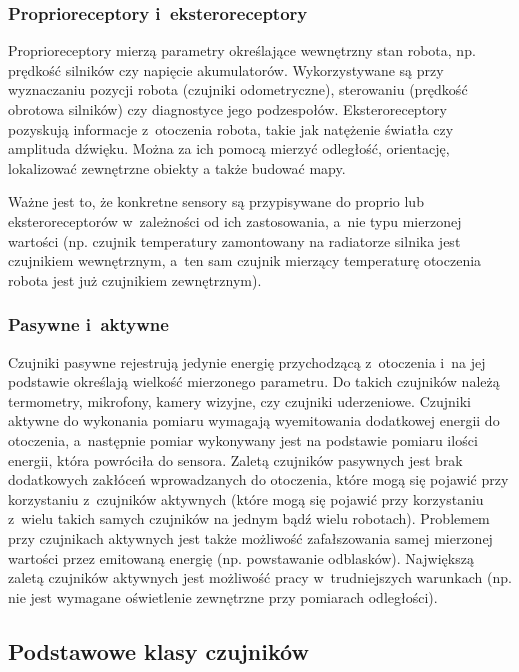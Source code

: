 \subsubsection{Proprioreceptory i~eksteroreceptory}

Proprioreceptory mierzą parametry określające wewnętrzny stan
robota, np. prędkość silników czy napięcie akumulatorów. Wykorzystywane są
przy wyznaczaniu pozycji robota (czujniki odometryczne), sterowaniu (prędkość
obrotowa silników) czy diagnostyce jego podzespołów. Eksteroreceptory
pozyskują informacje z~otoczenia robota, takie jak natężenie
światła czy amplituda dźwięku. Można za ich pomocą mierzyć odległość,
orientację, lokalizować zewnętrzne obiekty a także budować mapy.

Ważne jest to, że konkretne sensory są przypisywane do proprio lub
eksteroreceptorów w~zależności od ich zastosowania, a~nie typu mierzonej
wartości (np. czujnik temperatury zamontowany na radiatorze silnika jest
czujnikiem wewnętrznym, a~ten sam czujnik mierzący temperaturę otoczenia robota
jest już czujnikiem zewnętrznym).

\subsubsection{Pasywne i~aktywne}

Czujniki pasywne rejestrują jedynie energię przychodzącą z~otoczenia i~na
jej podstawie określają wielkość mierzonego parametru. Do takich czujników
należą termometry, mikrofony, kamery wizyjne, czy czujniki uderzeniowe.
Czujniki aktywne do wykonania pomiaru wymagają wyemitowania dodatkowej energii
do otoczenia, a~następnie pomiar wykonywany jest na podstawie pomiaru ilości
energii, która powróciła do sensora. Zaletą czujników pasywnych jest brak
dodatkowych zakłóceń wprowadzanych do otoczenia, które mogą się pojawić
przy korzystaniu z~czujników aktywnych (które mogą się pojawić przy korzystaniu
z~wielu takich samych czujników na jednym bądź wielu robotach). Problemem
przy czujnikach aktywnych jest także możliwość zafałszowania samej mierzonej
wartości przez emitowaną energię (np. powstawanie odblasków). Największą zaletą
czujników aktywnych jest możliwość pracy w~trudniejszych warunkach (np. nie
jest wymagane oświetlenie zewnętrzne przy pomiarach odległości).

\subsection{Podstawowe klasy czujników}

